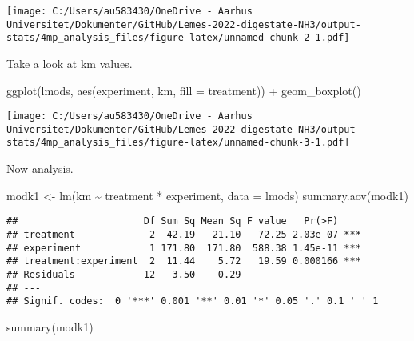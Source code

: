 \documentclass[
]{article}
\newenvironment{Shaded}{\begin{snugshade}}{\end{snugshade}}
\newcommand{\AttributeTok}[1]{\textcolor[rgb]{0.77,0.63,0.00}{#1}}
\newcommand{\FunctionTok}[1]{\textcolor[rgb]{0.00,0.00,0.00}{#1}}
\newcommand{\NormalTok}[1]{#1}
\newcommand{\OtherTok}[1]{\textcolor[rgb]{0.56,0.35,0.01}{#1}}
\newcommand{\SpecialCharTok}[1]{\textcolor[rgb]{0.00,0.00,0.00}{#1}}
\begin{document}
\texttt{[image: C:/Users/au583430/OneDrive - Aarhus Universitet/Dokumenter/GitHub/Lemes-2022-digestate-NH3/output-stats/4mp\_analysis\_files/figure-latex/unnamed-chunk-2-1.pdf]}

Take a look at km values.

\begin{Shaded}
\begin{Highlighting}[]
\FunctionTok{ggplot}\NormalTok{(lmods, }\FunctionTok{aes}\NormalTok{(experiment, km, }\AttributeTok{fill =}\NormalTok{ treatment)) }\SpecialCharTok{+}
  \FunctionTok{geom\_boxplot}\NormalTok{()}
\end{Highlighting}
\end{Shaded}

\texttt{[image: C:/Users/au583430/OneDrive - Aarhus Universitet/Dokumenter/GitHub/Lemes-2022-digestate-NH3/output-stats/4mp\_analysis\_files/figure-latex/unnamed-chunk-3-1.pdf]}

Now analysis.

\begin{Shaded}
\begin{Highlighting}[]
\NormalTok{modk1 }\OtherTok{\textless{}{-}} \FunctionTok{lm}\NormalTok{(km }\SpecialCharTok{\textasciitilde{}}\NormalTok{ treatment }\SpecialCharTok{*}\NormalTok{ experiment, }\AttributeTok{data =}\NormalTok{ lmods)}
\FunctionTok{summary.aov}\NormalTok{(modk1)}
\end{Highlighting}
\end{Shaded}

\begin{verbatim}
##                      Df Sum Sq Mean Sq F value   Pr(>F)    
## treatment             2  42.19   21.10   72.25 2.03e-07 ***
## experiment            1 171.80  171.80  588.38 1.45e-11 ***
## treatment:experiment  2  11.44    5.72   19.59 0.000166 ***
## Residuals            12   3.50    0.29                     
## ---
## Signif. codes:  0 '***' 0.001 '**' 0.01 '*' 0.05 '.' 0.1 ' ' 1
\end{verbatim}

\begin{Shaded}
\begin{Highlighting}[]
\FunctionTok{summary}\NormalTok{(modk1)}
\end{Highlighting}
\end{Shaded}
\end{document}
